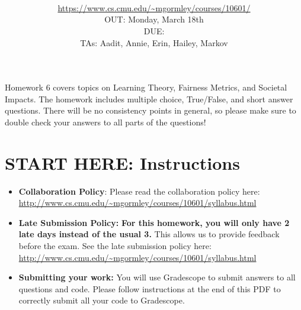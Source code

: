 \documentclass[11pt,addpoints,answers]{exam}
\title{\textsc{\hwName}
} %
\author{\courseName\\
\url{https://www.cs.cmu.edu/~mgormley/courses/10601/} \\
OUT: Monday, March 18th \\
DUE: \dueDate{} \\ 
TAs: Aadit, Annie, Erin, Hailey, Markov
}
\date{}
\date{}
\begin{document}
\maketitle 

\begin{notebox}
Homework 6 covers topics on Learning Theory, Fairness Metrics, and Societal Impacts. The homework includes multiple choice, True/False, and short answer questions. There will be no consistency points in general, so please make sure to double check your answers to all parts of the questions!
\end{notebox}
\newcommand \maxsubs {10 }
\section*{START HERE: Instructions}
\begin{itemize}

\item \textbf{Collaboration Policy}: Please read the collaboration policy here: \url{http://www.cs.cmu.edu/~mgormley/courses/10601/syllabus.html}

\item\textbf{Late Submission Policy:} \textbf{For this homework, you will only have 2 late days instead of the usual 3.} This allows us to provide feedback before the exam. See the late submission policy here: \url{http://www.cs.cmu.edu/~mgormley/courses/10601/syllabus.html}

\item\textbf{Submitting your work:} You will use Gradescope to submit
  answers to all questions and code. Please
  follow instructions at the end of this PDF to correctly submit all your code to Gradescope.

  \begin{itemize}
    

    

\end{itemize}
\end{itemize}
\end{document}
